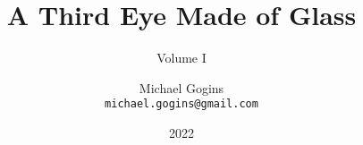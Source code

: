 

\title{A Third Eye Made of Glass}
\subtitle{Volume I }
\author{Michael Gogins \\ \texttt{michael.gogins@gmail.com}}
\date{2022 }
\publishers{Irreducible Productions, New York}

\maketitle
	




